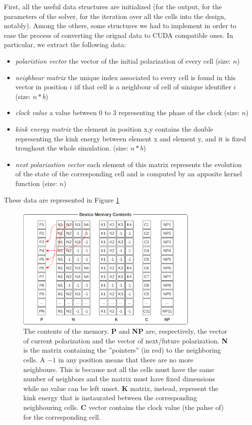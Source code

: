 First, all the useful data structures are initialized (for the output, for the parameters of the solver, for the iteration over all the cells into the design, notably). Among the others, some structures we had to implement in order to ease the process of converting the orignal data to CUDA compatible ones. In particular, we extract the following data:
\begin{itemize}
\item \textsl{polariztion vector} the vector of the initial polarization of every cell  (size: $n$)
\item \textsl{neighbour matrix} the unique index associated to every cell is found in this vector in position $i$ iif that cell is a neighbour of cell of uinique identifier $i$  (size: $n*b$)
\item \textsl{clock value} a value between 0 to 3 representing the phase of the clock (size: $n$)
\item \textsl{kink energy matrix} the element in position x,y contains the double representing the kink energy between element x and element y, and it is fixed troughout the whole simulation. (size: $n*b$)
\item \textsl{next polarization vector} each element of this matrix represents the evolution of the state of the corresponding cell and is computed by an apposite kernel function (size: $n$)
\end{itemize}
These data are represented in Figure \ref{fig:impdetmem}

\begin{figure}[h!bt]
	\centerline{\includegraphics[width=0.8\textwidth]{img/impdetmem.png}}
	\caption{The contents of the memory. \textbf{P} and \textbf{NP} are, respectively, the vector of current polarization and the vector of next/future polarization. \textbf{N} is the matrix containing the ''pointers'' (in red) to the neighboring cells. A $-1$ in any position means that there are no more neighbours. This is because not all the cells must have the same number of neighbors and the matrix must have fixed dimensions while no value can be left unset. \textbf{K} matrix, instead, represent the kink energy that is instaurated between the corresponding neighbouring cells. \textbf{C} vector contains the clock value (the pahse of) for the corresponding cell.}
	\label{fig:impdetmem}
\end{figure}

